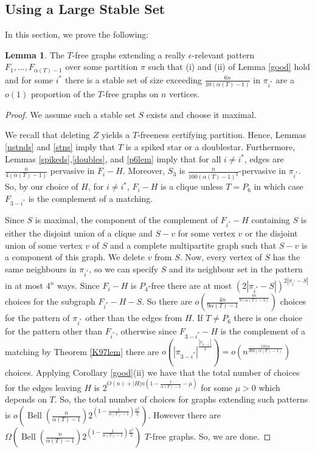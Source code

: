 \documentclass[12pt]{article}
\theoremstyle{definition}
\newtheorem{lemma}[theorem]{Lemma}
\DeclareMathOperator{\Bell}{Bell}
\begin{document}
\subsection{Using a Large Stable Set} 

In this section, we prove the following: 


\begin{lemma}\label{nobigstable}
The  $T$-free  graphs extending a really  $\epsilon$-relevant pattern $F_1,...,F_{\alpha(T)-1}$  over some partition $\pi$ such that (i) and (ii) of Lemma \ref{good} hold  and for some $i^*$ there is a stable set of size exceeding $ \frac{6n}{10(\alpha(T)-1)}$ in  $\pi_{i^*}$  
are   a $o(1)$ proportion of the $T$-free graphs on $n$ vertices. 
\end{lemma}

\begin{proof}
We assume such a stable set $S$ exists and choose it maximal.

We recall  that  deleting $Z$ yields a $T$-freeness certifying   partition.
Hence, Lemmas  \ref{nstnds} and \ref{stns} imply that $T$ is  a spiked star or a doublestar.  
Furthermore,  Lemmas \ref{spikeds},\ref{doubles}, and \ref{p6lem}  imply  that  for all $i \neq i^*$, edges are $\frac{n}{4(\alpha(T)-1)}$ pervasive in $F_i-H$. 
Moreover, $S_3$ is  $\frac{n}{100( \alpha(T)-1)^2}$-pervasive in $\pi_{i^*}$. 
So, by our choice of $H$, for $i \neq i^*$, $F_i-H$ is a clique unless  $T=P_6$ in which case $F_{3-i^*}$ is the complement of a matching. 

Since $S$ is maximal,  the component of the complement of $F_{i^*}-H$ containing $S$ is either the disjoint union of a clique 
and $S-v$  for some vertex $v$ or the disjoint union of some vertex $v$ of $S$ and a complete multipartite graph such that $S-v$ is a component of this graph.
We delete $v$ from $S$. Now, every vertex of $S$ has the same neighbours in $\pi_{i^*}$, so we can specify $S$ and 
its neighbour set  in the pattern in at most $4^{n}$ ways. 
Since $F_i-H$ is $P_4$-free there are at most $(2|\pi_{i^*}-S|)^{2|\pi_{i^*}-S|}$ choices for the subgraph $F_{i^*}-H-S$.
So there are $o(\frac{4n}{9\alpha(T)-1}^{\frac{4n}{9(\alpha(T)-1)}})$  choices for the pattern of $\pi_{i^*}$ other than the edges from $H$. 
If $T \neq P_6$ there is one choice for  the pattern other than $F_{i^*}$, otherwise since $F_{3-i^*}-H$ is the complement of a matching by Theorem  \ref{K97lem}  there are $o(|\pi_{3-i^*}|^{\frac{|\pi_{3-i^*}|}{2}})=o(n^{\frac{101n}{200(\alpha(T)-1)}})$ choices. 
 Applying Corollary \ref{good}(ii)  we have that 
the total number of choices for the edges leaving $H$ is $2^{O(n)+|H|n(1-\frac{1}{\alpha(T)-1}-\mu)}$ for some $\mu>0$ which depends on $T$. 
So, the total number of choices for graphs extending such patterns is $o(\Bell(\frac{n}{\alpha(T)-1})2^{(1-\frac{1}{\alpha(T)-1})\frac{n^2}{2}})$. 
However there are $\Omega(\Bell(\frac{n}{\alpha(T)-1})2^{(1-\frac{1}{\alpha(T)-1})\frac{n^2}{2}})$ $T$-free graphs. 
So,  we are done. 
 \end{proof}
 
\end{document}
